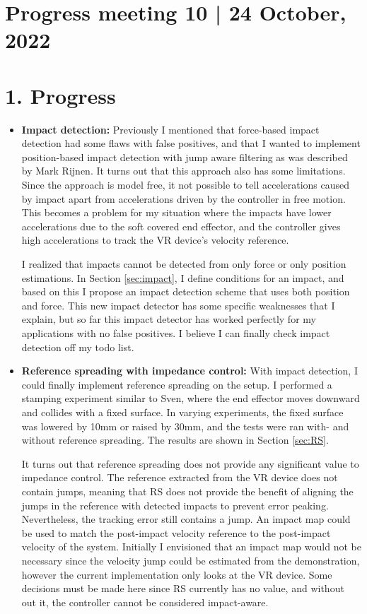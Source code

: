 \documentclass[11pt]{report}
\numberwithin{equation}{section}        %
\numberwithin{figure}{section}          %
\numberwithin{table}{section}           %
\begin{document}
  \section*{Progress meeting 10 | 24 October, 2022}


  \section*{1. Progress}
  \begin{itemize}
  
  \item \textbf{Impact detection:} Previously I mentioned that force-based impact detection had some flaws with false positives, and that I wanted to implement position-based impact detection with jump aware filtering as was described by Mark Rijnen. It turns out that this approach also has some limitations. Since the approach is model free, it not possible to tell accelerations caused by impact apart from accelerations driven by the controller in free motion. This becomes a problem for my situation where the impacts have lower accelerations due to the soft covered end effector, and the controller gives high accelerations to track the VR device's velocity reference.

  I realized that impacts cannot be detected from only force or only position estimations. In Section \ref{sec:impact}, I define conditions for an impact, and based on this I propose an impact detection scheme that uses both position and force. This new impact detector has some specific weaknesses that I explain, but so far this impact detector has worked perfectly for my applications with no false positives. I believe I can finally check impact detection off my todo list.

  \item \textbf{Reference spreading with impedance control:} With impact detection, I could finally implement reference spreading on the setup. I performed a stamping experiment similar to Sven, where the end effector moves downward and collides with a fixed surface. In varying experiments, the fixed surface was lowered by 10mm or raised by 30mm, and the tests were ran with- and without reference spreading. The results are shown in Section \ref{sec:RS}.

  It turns out that reference spreading does not provide any significant value to impedance control. The reference extracted from the VR device does not contain jumps, meaning that RS does not provide the benefit of aligning the jumps in the reference with detected impacts to prevent error peaking. Nevertheless, the tracking error still contains a jump. An impact map could be used to match the post-impact velocity reference to the post-impact velocity of the system. Initially I envisioned that an impact map would not be necessary since the velocity jump could be estimated from the demonstration, however the current implementation only looks at the VR device. Some decisions must be made here since RS currently has no value, and without out it, the controller cannot be considered impact-aware.


\end{itemize}
\end{document}
